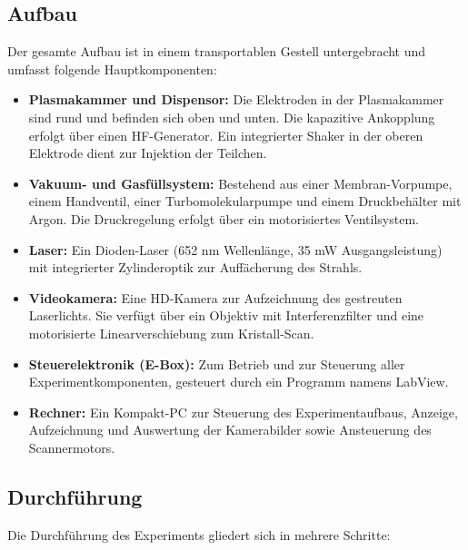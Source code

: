 \documentclass[12pt,a4paper,ngerman]{article}
\begin{document}
\subsection{Aufbau}
Der gesamte Aufbau ist in einem transportablen Gestell untergebracht und umfasst folgende Hauptkomponenten:
\begin{itemize}
    \item \textbf{Plasmakammer und Dispensor:} Die Elektroden in der Plasmakammer sind rund und befinden sich oben und unten. Die kapazitive Ankopplung erfolgt über einen HF-Generator. Ein integrierter Shaker in der oberen Elektrode dient zur Injektion der Teilchen.
    \item \textbf{Vakuum- und Gasfüllsystem:} Bestehend aus einer Membran-Vorpumpe, einem Handventil, einer Turbomolekularpumpe und einem Druckbehälter mit Argon. Die Druckregelung erfolgt über ein motorisiertes Ventilsystem.
    \item \textbf{Laser:} Ein Dioden-Laser (652 nm Wellenlänge, 35 mW Ausgangsleistung) mit integrierter Zylinderoptik zur Auffächerung des Strahls.
    \item \textbf{Videokamera:} Eine HD-Kamera zur Aufzeichnung des gestreuten Laserlichts. Sie verfügt über ein Objektiv mit Interferenzfilter und eine motorisierte Linearverschiebung zum Kristall-Scan.
    \item \textbf{Steuerelektronik (E-Box):} Zum Betrieb und zur Steuerung aller Experimentkomponenten, gesteuert durch ein Programm namens \glqq{}LabView\grqq{}.
    \item \textbf{Rechner:} Ein Kompakt-PC zur Steuerung des Experimentaufbaus, Anzeige, Aufzeichnung und Auswertung der Kamerabilder sowie Ansteuerung des Scannermotors.
\end{itemize}

\newpage
\subsection{Durchführung}
Die Durchführung des Experiments gliedert sich in mehrere Schritte:
\end{document}
